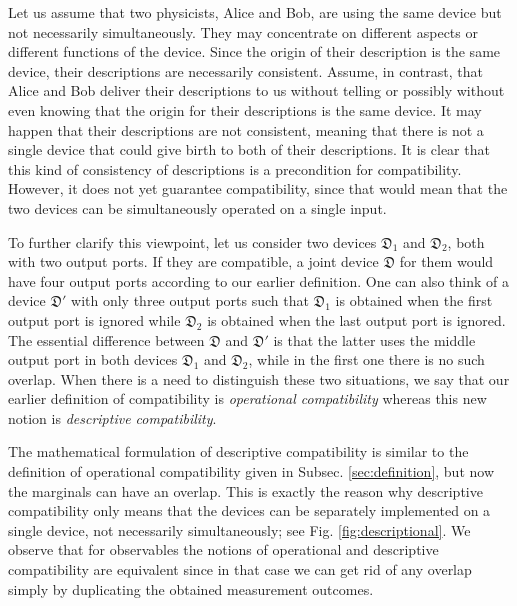\documentclass[12pt]{article}
\theoremstyle{definition}
\newcommand{\Dev}{\mathfrak{D}} %
\begin{document}
Let us assume that two physicists, Alice and Bob, are using the same device but not necessarily simultaneously.
They may concentrate on different aspects or different functions of the device.
Since the origin of their description is the same device, their descriptions are necessarily consistent.
Assume, in contrast, that Alice and Bob deliver their descriptions to us without telling or possibly without even knowing that the origin for their descriptions is the same device.
It may happen that their descriptions are not consistent, meaning that there is not a single device that could give birth to both of their descriptions.
It is clear that this kind of consistency of descriptions is a precondition for compatibility.
However, it does not yet guarantee compatibility, since that would mean that the two devices can be simultaneously operated on a single input.

To further clarify this viewpoint, let us consider two devices $\Dev_1$ and $\Dev_2$, both with two output ports. 
If they are compatible, a joint device $\Dev$ for them would have four output ports according to our earlier definition.
One can also think of a device $\Dev'$ with only three output ports such that $\Dev_1$ is obtained when the first output port is ignored while $\Dev_2$ is obtained when the last output port is ignored. 
The essential difference between $\Dev$ and $\Dev'$ is that the latter uses the middle output port in both devices $\Dev_1$ and $\Dev_2$, while in the first one there is no such overlap.
When there is a need to distinguish these two situations, we say that our earlier definition of compatibility is \emph{operational compatibility} whereas this new notion is \emph{descriptive compatibility}.

The mathematical formulation of descriptive compatibility is similar to the definition of operational compatibility given in Subsec. \ref{sec:definition}, but now the marginals can have an overlap. 
This is exactly the reason why descriptive compatibility only means that the devices can be separately implemented on a single device, not necessarily simultaneously; see Fig. \ref{fig:descriptional}.
We observe that for observables the notions of operational and descriptive compatibility are equivalent since in that case we can get rid of any overlap simply by duplicating the obtained measurement outcomes.
\end{document}
